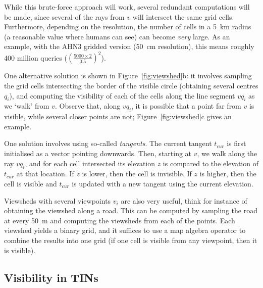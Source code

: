 %

While this brute-force approach will work, several redundant computations will be made, since several of the rays from $v$ will intersect the same grid cells.
Furthermore, depending on the resolution, the number of cells in a \qty{5}{\km} radius (a reasonable value where humans can see) can become \emph{very} large.
As an example, with the AHN3 gridded version (\qty{50}{\cm} resolution), this means roughly 400 million queries ($(\frac{5000 \times 2}{0.5})^2$).

%

One alternative solution is shown in Figure~\ref{fig:viewshed}b: it involves sampling the grid cells intersecting the border of the visible circle (obtaining several centres $q_i$), and computing the visibility of each of the cells along the line segment $vq_i$ as we `walk' from $v$.
Observe that, along $vq_i$, it is possible that a point far from $v$ is visible, while several closer points are not; Figure~\ref{fig:viewshed}c gives an example.

One solution involves using so-called \emph{tangents}.
The current tangent $t_{cur}$ is first initialised as a vector pointing downwards.
Then, starting at $v$, we walk along the ray $vq_i$, and for each cell intersected its elevation $z$ is compared to the elevation of $t_{cur}$ at that location.
If $z$ is lower, then the cell is invisible.
If $z$ is higher, then the cell is visible and $t_{cur}$ is updated with a new tangent using the current elevation.

Viewsheds with several viewpoints $v_i$ are also very useful, think for instance of obtaining the viewshed along a road.
This can be computed by sampling the road at every \qty{50}{\m} and computing the viewsheds from each of the points. 
Each viewshed yields a binary grid, and it suffices to use a map algebra operator to combine the results into one grid (if one cell is visible from any viewpoint, then it is visible).


%
\subsection{Visibility in TINs}

